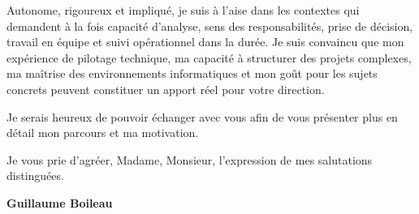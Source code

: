 \documentclass[11pt,a4paper]{altacv}
\begin{document}
{Autonome, rigoureux et impliqué, je suis à l'aise dans les contextes qui demandent à la fois capacité d'analyse, sens des responsabilités, prise de décision, travail en équipe et suivi opérationnel dans la durée. Je suis convaincu que mon expérience de pilotage technique, ma capacité à structurer des projets complexes, ma maîtrise des environnements informatiques et mon goût pour les sujets concrets peuvent constituer un apport réel pour votre direction.

Je serais heureux de pouvoir échanger avec vous afin de vous présenter plus en détail mon parcours et ma motivation.

Je vous prie d'agréer, Madame, Monsieur, l'expression de mes salutations distinguées.

\textbf{Guillaume Boileau}

}
\end{document}

